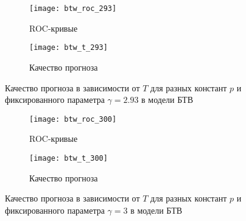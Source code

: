 \begin{figure}[h]
	\centering
	\hspace{-20mm}
	\begin{subfigure}[t]{0.4\textwidth}
		\texttt{[image: btw\_roc\_293]} 
		\caption{ROC-кривые}
	\end{subfigure}
	\hspace*{10mm}
	\begin{subfigure}[t]{0.4\textwidth}
		\texttt{[image: btw\_t\_293]} 
		\caption{Качество прогноза}
	\end{subfigure}
	\caption{Качество прогноза в зависимости от $T$ для разных констант $p$ и фиксированного параметра $\gamma=2.93$ в модели БТВ}
\end{figure}

\begin{figure}[h]
	\centering
	\hspace{-20mm}
	\begin{subfigure}[t]{0.4\textwidth}
		\texttt{[image: btw\_roc\_300]} 
		\caption{ROC-кривые}
	\end{subfigure}
	\hspace*{10mm}
	\begin{subfigure}[t]{0.4\textwidth}
		\texttt{[image: btw\_t\_300]} 
		\caption{Качество прогноза}
	\end{subfigure}
	\caption{Качество прогноза в зависимости от $T$ для разных констант $p$ и фиксированного параметра $\gamma=3$ в модели БТВ}
\end{figure}

\newpage
\clearpage

